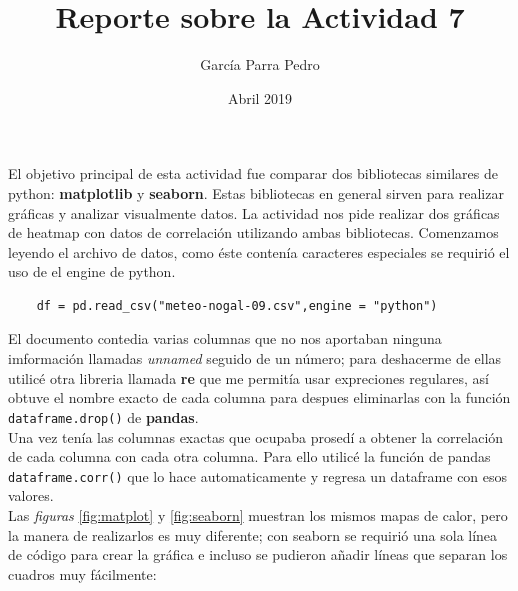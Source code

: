 \documentclass[12pt]{article}
\title{Reporte sobre la Actividad 7}
\author{García Parra Pedro}
\date{Abril 2019}
\begin{document}
\maketitle
El objetivo principal de esta actividad fue comparar dos bibliotecas similares de python: \textbf{matplotlib} y \textbf{seaborn}. Estas bibliotecas en general sirven para realizar gr\'aficas y analizar visualmente datos. La actividad nos pide realizar dos gr\'aficas de heatmap con datos de correlaci\'on utilizando ambas bibliotecas.
Comenzamos leyendo el archivo de datos, como \'este conten\'ia caracteres especiales se requiri\'o el uso de el engine de python.
\begin{verbatim}
    df = pd.read_csv("meteo-nogal-09.csv",engine = "python") 
\end{verbatim}
El documento contedia varias columnas que no nos aportaban ninguna imformaci\'on llamadas \textit{unnamed} seguido de un n\'umero; para deshacerme de ellas utilic\'e otra libreria llamada \textbf{re} que me permit\'ia usar expreciones regulares, as\'i obtuve el nombre exacto de cada columna para despues eliminarlas con la funci\'on \texttt{dataframe.drop()} de \textbf{pandas}.\\
Una vez ten\'ia las columnas  exactas que ocupaba prosed\'i a obtener la correlaci\'on de cada columna con cada otra columna. Para ello utilic\'e la funci\'on de pandas \texttt{dataframe.corr()} que lo hace automaticamente y regresa un dataframe con esos valores.\\
Las \textit{figuras} \ref{fig:matplot} y \ref{fig:seaborn} muestran los mismos mapas de calor, pero la manera de realizarlos es muy diferente; con seaborn se requiri\'o una sola l\'inea de c\'odigo para crear la gr\'afica e incluso se pudieron a\~nadir l\'ineas que separan los cuadros muy f\'acilmente:
\end{document}
